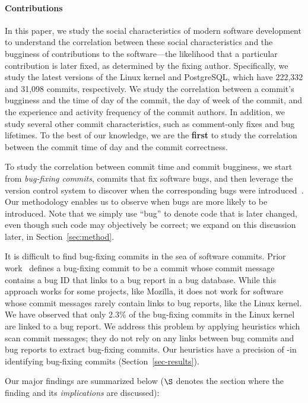 \paragraph{Contributions}

In this paper, we study the social characteristics of modern software
development to understand the correlation between these social characteristics
and the bugginess of contributions to the software---the likelihood that a
particular contribution is later fixed, as determined by the fixing author.
Specifically, we study the latest versions of the Linux kernel and PostgreSQL,
which have 222,332 and 31,098 commits, respectively.  We study the correlation
between a commit's bugginess and the time of day of the commit, the day of week
of the commit, and the experience and activity frequency of the commit authors.
In addition, we study several other commit characteristics, such as comment-only
fixes and bug lifetimes.  To the best of our knowledge, we are the {\bf first}
to study the correlation between the commit time of day and the commit
correctness.

To study the correlation between commit time and commit bugginess, we start from
{\em bug-fixing commits}, commits that fix software bugs, and then leverage the
version control system to discover when the corresponding bugs were
introduced~\cite{sliwerski-msr-2005}.  Our methodology enables us to observe
when bugs are more likely to be introduced.  Note that we simply use ``bug'' to
denote code that is later changed, even though such code may objectively be
correct; we expand on this discussion later, in Section~\ref{sec:method}.

It is difficult to find bug-fixing commits in the sea of software commits.
Prior work~\cite{sliwerski-msr-2005} defines a bug-fixing commit to be a commit
whose commit message contains a bug ID that links to a bug report in a bug
database. While this approach works for some projects, like Mozilla, it does not
work for software whose commit messages rarely contain links to bug reports,
like the Linux kernel.  We have observed that only 2.3\% of the bug-fixing
commits in the Linux kernel are linked to a bug report.  We address this problem
by applying heuristics which scan commit messages; they do not rely on any links
between bug commits and bug reports to extract bug-fixing commits.  Our
heuristics have a precision of \postP-\linuxP in identifying bug-fixing commits
(Section~\ref{sec-results}).

Our major findings are summarized below ($\S$ denotes the section where the
finding and its {\em implications} are discussed):

